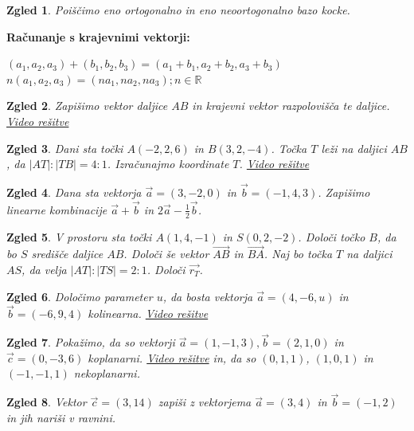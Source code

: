 \documentclass{article}
\newtheorem*{zgled}{Zgled}
\begin{document}
\begin{zgled}
    Poiščimo eno ortogonalno in eno neoortogonalno bazo kocke.
\end{zgled}

\textbf{Računanje s krajevnimi vektorji:}

$(a_1,a_2,a_3)+(b_1,b_2,b_3)=(a_1+b_1,a_2+b_2,a_3+b_3)$\\
$n(a_1,a_2,a_3)=(na_1,na_2,na_3); n\in \mathbb{R}$

\begin{zgled}
    Zapišimo vektor daljice $AB$ in krajevni vektor razpolovišča te daljice. \href{https://youtu.be/KS_ZTJiAqdY}{Video rešitve}
\end{zgled}
\begin{zgled}
    Dani sta točki $A(-2,2,6)$ in $B(3,2,-4)$. Točka $T$ leži na daljici $AB$, da $|AT|:|TB|=4:1$. Izračunajmo koordinate $T$.
    \href{https://youtu.be/I5FE3vhoatk}{Video rešitve}
\end{zgled}

\begin{zgled}
    Dana sta vektorja $\vec{a}=(3,-2,0)$ in $\vec{b}=(-1,4,3)$. Zapišimo linearne kombinacije $\vec{a}+\vec{b}$ in $2\vec{a}-\frac{1}{2}\vec{b}$.
\end{zgled}

\begin{zgled}
    V prostoru sta točki $A(1,4,-1)$ in $S(0,2,-2)$. Določi točko $B$, da bo $S$ središče daljice $AB$. Določi še vektor $\vec{AB}$ in $\vec{BA}$. Naj bo točka $T$ na daljici $AS$, da velja $|AT|:|TS|=2:1$. Določi $\vec{r_T}$.
\end{zgled}

\begin{zgled}
    Določimo parameter $u$, da bosta vektorja $\vec{a}=(4,-6,u)$ in $\vec{b}=(-6,9,4)$ kolinearna. \href{https://youtu.be/bGx1agtOIvw}{Video rešitve}
\end{zgled}

\begin{zgled}
    Pokažimo, da so vektorji $\vec{a}=(1,-1,3), \vec{b}=(2,1,0)$ in $\vec{c}=(0,-3,6)$ koplanarni. \href{https://youtu.be/-qfYWHrmi-8}{Video rešitve} in, da so $(0,1,1)$, $(1,0,1)$ in $(-1,-1,1)$ nekoplanarni.
\end{zgled}

\begin{zgled}
    Vektor $\vec{c}=(3,14)$ zapiši z vektorjema $\vec{a}=(3,4)$ in $\vec{b}=(-1,2)$ in jih nariši v ravnini.
\end{zgled}
\end{document}
